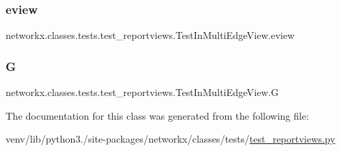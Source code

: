 \subsubsection{\texorpdfstring{eview}{eview}}
{\footnotesize\ttfamily networkx.\+classes.\+tests.\+test\+\_\+reportviews.\+Test\+In\+Multi\+Edge\+View.\+eview}

\mbox{\label{classnetworkx_1_1classes_1_1tests_1_1test__reportviews_1_1TestInMultiEdgeView_a917f481167e4f81c558d0ffa6731bf07}} 
\subsubsection{\texorpdfstring{G}{G}}
{\footnotesize\ttfamily networkx.\+classes.\+tests.\+test\+\_\+reportviews.\+Test\+In\+Multi\+Edge\+View.\+G}



The documentation for this class was generated from the following file\+:\begin{DoxyCompactItemize}
\item 
venv/lib/python3./site-\/packages/networkx/classes/tests/\hyperlink{test__reportviews_8py}{test\+\_\+reportviews.\+py}\end{DoxyCompactItemize}
